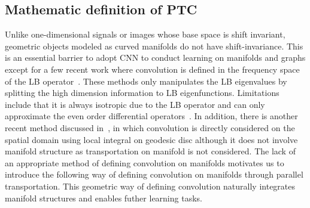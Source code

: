 \documentclass[10pt,twocolumn,letterpaper]{article}
\begin{document}
\subsection{Mathematic definition of PTC}
Unlike one-dimensional signals or images whose base space is shift invariant, geometric objects modeled as curved manifolds do not have shift-invariance. This is an essential barrier to adopt CNN to conduct learning on manifolds and graphs except for a few recent work where convolution is defined in the frequency space of the LB operator~\cite{bruna2013spectral,shotton2013real,rodola2014dense,rustamov2013wavelets}. These methods only manipulates the LB eigenvalues by splitting the high dimension information to LB eigenfunctions. Limitations include that it is always isotropic due to the LB operator and can only approximate the even order differential operators~\cite{dong2015sparse}. In addition, there is another recent method discussed in~\cite{masci2015shapenet}, in which convolution is directly considered on the spatial domain using local integral on geodesic disc although it does not involve manifold structure as transportation on manifold is not considered. The lack of an appropriate method of defining convolution on manifolds motivates us to introduce the following way of defining convolution on manifolds through parallel transportation. This geometric way of defining convolution naturally integrates manifold structures and enables futher learning tasks.
\end{document}
